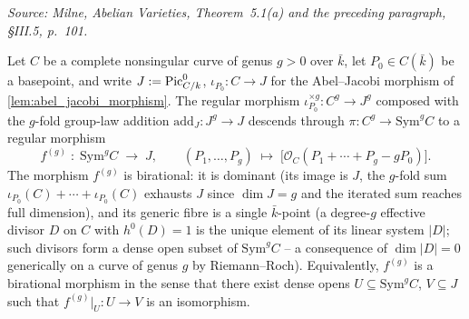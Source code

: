 \begin{lemma}
  \label{lem:symmetric_product_to_jacobian}

  \textit{Source: Milne, \emph{Abelian Varieties}, Theorem~5.1(a) and the
  preceding paragraph, \S III.5, p.~101.}

  Let \(C\) be a complete nonsingular curve of genus \(g > 0\) over \(\bar k\),
  let \(P_0 \in C(\bar k)\) be a basepoint, and write \(J := \operatorname{Pic}^0_{C/k}\),
  \(\iota_{P_0} \colon C \to J\) for the Abel--Jacobi morphism of
  \cref{lem:abel_jacobi_morphism}. The regular morphism
  \(\iota_{P_0}^{\times g} \colon C^g \to J^g\) composed with the \(g\)-fold
  group-law addition \(\mathrm{add}_J \colon J^g \to J\) descends through
  \(\pi \colon C^g \to \mathrm{Sym}^g C\) to a regular morphism
  \[
    f^{(g)} \;\colon\; \mathrm{Sym}^g C \;\longrightarrow\; J,
    \qquad (P_1, \ldots, P_g) \;\longmapsto\;
      \bigl[\mathcal O_C(P_1 + \cdots + P_g - g P_0)\bigr].
  \]
  The morphism \(f^{(g)}\) is birational: it is dominant (its image is
  \(J\), the \(g\)-fold sum \(\iota_{P_0}(C) + \cdots + \iota_{P_0}(C)\) exhausts
  \(J\) since \(\dim J = g\) and the iterated sum reaches full dimension), and
  its generic fibre is a single \(\bar k\)-point (a degree-\(g\) effective
  divisor \(D\) on \(C\) with \(h^0(D) = 1\) is the unique element of its linear
  system \(|D|\); such divisors form a dense open subset of \(\mathrm{Sym}^g
  C\) -- a consequence of \(\dim |D| = 0\) generically on a curve of genus \(g\)
  by Riemann--Roch). Equivalently, \(f^{(g)}\) is a birational morphism in
  the sense that there exist dense opens
  \(U \subseteq \mathrm{Sym}^g C\), \(V \subseteq J\) such that
  \(f^{(g)}|_U \colon U \to V\) is an isomorphism.
\end{lemma}

